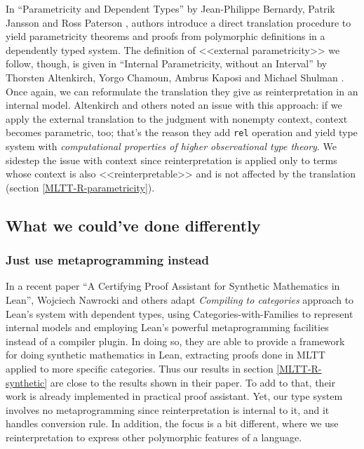 In ``Parametricity and Dependent Types'' by
Jean-Philippe Bernardy, Patrik Jansson and Ross Paterson
\cite{Bernardy:Parametricity2010}, authors introduce a
direct translation procedure to yield parametricity
theorems and proofs from polymorphic definitions in a
dependently typed system. The definition of <<external
parametricity>> we follow, though, is given in
``Internal Parametricity, without an Interval'' by
Thorsten Altenkirch, Yorgo Chamoun, Ambrus Kaposi and
Michael Shulman \cite{Altenkirch:Parametricity2024}.
Once again, we can reformulate the translation they give
as reinterpretation in an internal model. Altenkirch and
others noted an issue with this approach: if we apply
the external translation to the judgment with nonempty
context, context becomes parametric, too; that's the
reason they add \texttt{rel} operation and yield type
system with \textit{computational properties of higher
observational type theory}. We sidestep the issue with
context since reinterpretation is applied only to terms
whose context is also <<reinterpretable>> and is not
affected by the translation (section
\ref{MLTT-R-parametricity}).

\subsection{What we could've done differently}

\subsubsection{Just use metaprogramming instead}

In a recent paper ``A Certifying Proof Assistant for
Synthetic Mathematics in Lean'', Wojciech Nawrocki and
others \cite{Nawrocki:Lean2026} adapt \textit{Compiling
to categories} approach \cite{Elliott:Compcat2017} to
Lean's system with dependent types, using
Categories-with-Families to represent internal models
and employing Lean's powerful metaprogramming facilities
instead of a compiler plugin. In doing so, they are able
to provide a framework for doing synthetic mathematics
in Lean, extracting proofs done in MLTT applied to more
specific categories. Thus our results in section
\ref{MLTT-R-synthetic} are close to the results shown in
their paper. To add to that, their work is already
implemented in practical proof assistant. Yet, our type
system involves no metaprogramming since
reinterpretation is internal to it, and it handles
conversion rule. In addition, the focus is a bit
different, where we use reinterpretation to express
other polymorphic features of a language.

